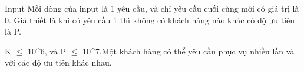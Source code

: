 Input
Mỗi dòng của input là 1 yêu cầu, và chỉ yêu cầu cuối cùng mới có giá trị là 0. Giả thiết là khi có yêu cầu 1 thì không có khách hàng nào khác có độ ưu tiên là P.  

   K $\le$ 10^6, và P $\le$  10^7.Một khách hàng có thể yêu cầu phục vụ nhiều lần và với các độ ưu tiên khác nhau.